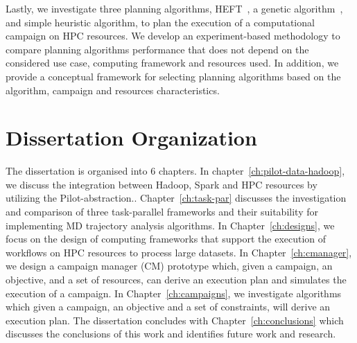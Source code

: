 Lastly, we investigate three planning algorithms, HEFT~\cite{topcuoglu2002performance}, a genetic algorithm~\cite{page2005algorithm}, and simple heuristic algorithm, to plan the execution of a computational campaign on HPC resources.
We develop an experiment-based methodology to compare planning algorithms performance that does not depend on the considered use case, computing framework and resources used.
In addition, we provide a conceptual framework for selecting planning algorithms based on the algorithm, campaign and resources characteristics.

\section{Dissertation Organization}
The dissertation is organised into 6 chapters.
In chapter~\ref{ch:pilot-data-hadoop}, we discuss the integration between Hadoop, Spark and HPC resources by utilizing the Pilot-abstraction..
Chapter~\ref{ch:task-par} discusses the investigation and comparison of three task-parallel frameworks and their suitability for implementing MD trajectory analysis algorithms.
In Chapter~\ref{ch:designs}, we focus on the design of computing frameworks that support the execution of workflows on HPC resources to process large datasets.
In Chapter~\ref{ch:cmanager}, we design a campaign manager (CM) prototype which, given a campaign, an objective, and a set of resources, can derive an execution plan and simulates the execution of a campaign.
In Chapter~\ref{ch:campaigns}, we investigate algorithms which given a campaign, an objective and a set of constraints, will derive an execution plan.
The dissertation concludes with Chapter~\ref{ch:conclusions} which discusses the conclusions of this work and identifies future work and research.






